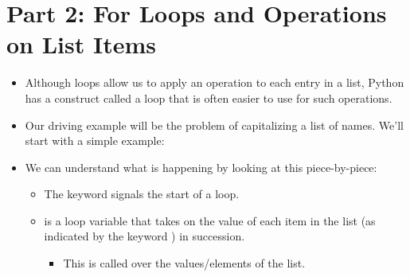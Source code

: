 \documentclass[letterpaper,10pt,english]{sphinxmanual}
\begin{document}
\section{Part 2:  For Loops and Operations on List Items}
\label{\detokenize{lecture_notes/lec10_lists2:part-2-for-loops-and-operations-on-list-items}}\begin{itemize}
\item {} 
Although  loops allow us to apply an operation to each entry in a list,
Python has a construct called a  loop that is often easier
to use for such operations.

\item {} 
Our driving example will be the problem of capitalizing a list of
names. We’ll start with a simple example:

\begin{sphinxVerbatim}[commandchars=\\\{\}]
  \PYG{p}{[}    \PYG{p}{]}
  \PYG{p}{[}\PYG{p}{]}
   
\end{sphinxVerbatim}

\item {} 
We can understand what is happening by looking at this
piece-by-piece:
\begin{itemize}
\item {} 
The keyword  signals the start of a loop.

\item {} 
 is a loop variable that takes on the value of each item
in the list (as indicated by the keyword ) in
succession.
\begin{itemize}
\item {} 
This is called  over the values/elements of the list.


\end{itemize}
\end{itemize}
\end{itemize}
\end{document}
